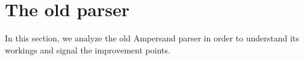 
\section{The old parser}
\label{sec:analysis}
In this section, we analyze the old Ampersand parser in order to understand its workings and signal the improvement points.






